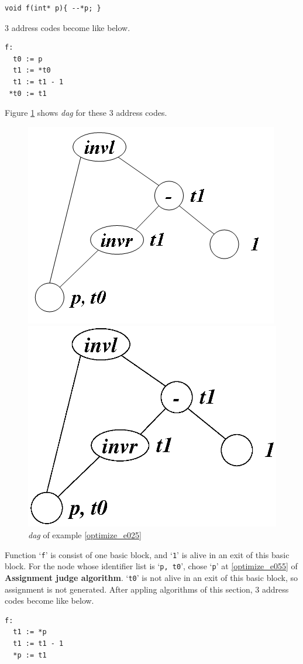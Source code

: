 \begin{Example}
\label{optimize_e025}
\begin{verbatim}
void f(int* p){ --*p; }
\end{verbatim}
3 address codes become like below.
\begin{verbatim}
f:
  t0 := p
  t1 := *t0
  t1 := t1 - 1
 *t0 := t1
\end{verbatim}
Figure \ref{optimize_e026} shows {\em dag} for these 3 address codes.
\begin{figure}[htbp]
\begin{center}
\begin{htmlonly}
\includegraphics[width=0.7\linewidth,height=0.552\linewidth]{opt011.png}
\end{htmlonly}
\begin{latexonly}
\includegraphics[width=0.7\linewidth,height=0.552\linewidth]{opt011.eps}
\end{latexonly}
\caption{{\em dag} of example \ref{optimize_e025}}
\label{optimize_e026}
\end{center}
\end{figure}
Function `{\tt{f}}' is consist of one basic block, and 
`{\tt{1}}' is alive in an exit of this basic block.
For the node whose identifier list is `{\tt{p, t0}}',
chose `{\tt{p}}' at \ref{optimize_e055} of {\bf Assignment judge
 algorithm}.
`{\tt{t0}}' is not alive in an exit of this basic block, so
assignment is not generated.
After appling algorithms of this section,
3 address codes become like below.
\begin{verbatim}
f:
  t1 := *p
  t1 := t1 - 1
  *p := t1
\end{verbatim}
\end{Example}

